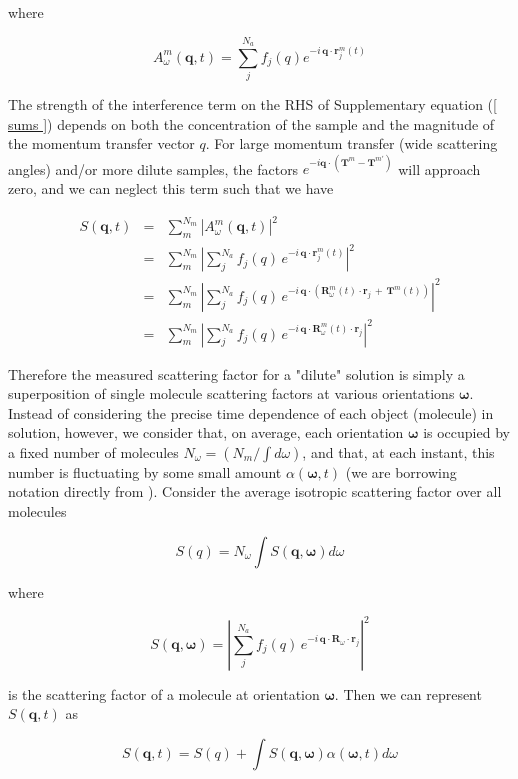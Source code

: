 \documentclass [12pt,fleqn]{article}
\def \be {\begin{equation}}
\def \ee {\end{equation}}
\def \beq {\begin{eqnarray}}
\def \eeq {\end{eqnarray}}
\begin{document}
where 

\be
A^m_\omega (\bm q,t ) = \sum_{j}^{N_a} f_j(q) e^{ -i \,\bm q \cdot \bm  r^m_j (t)  }
\ee

The strength of the interference term on the RHS of Supplementary equation (\ref{ sums }) depends on both the concentration of the sample and the magnitude of the momentum transfer vector $q$. For large momentum transfer (wide scattering angles) and/or more dilute samples, the factors $e^{-i \bm q \cdot (  \bm T^m - \bm T^{m'})}$ will approach zero, and we can neglect this term such that we have

\beq \label{ scatter}
S( \bm q, t) &=& \sum_m^{N_m} \left | A^m_\omega (\bm q,t ) \right|^2 \\
&=& \sum_m^{N_m} \left | \sum_{j}^{N_a} f_j(q)\, e^ { -i \,\bm q \cdot \bm  r^m _j (t)} \right | ^2   \\
&=& \sum_m^{N_m} \left | \sum_{j}^{N_a} f_j(q)\, e^ { -i \,\bm q \cdot \left (\bm {R}^m_\omega \left(t\right)\cdot \bm r_j \,+\, \bm {T}^m\left(t\right) \right)} \right | ^2 \\
&=& \sum_m^{N_m} \left | \sum_{j}^{N_a} f_j(q)\, e^ { -i \,\bm q \cdot \bm {R}^m_\omega (t)\cdot \bm r_j }  \right | ^2 
\eeq

Therefore the measured scattering factor for a "dilute" solution is simply a superposition of single molecule scattering factors at various orientations $\bm \omega$.  Instead of considering the precise time dependence of each object (molecule) in solution, however, we consider that, on average, each orientation $\bm \omega$ is occupied by a fixed number of molecules $N_\omega = (N_m/ \int d\omega)$, and that, at each instant, this number is fluctuating by some small amount $\alpha( \bm \omega, t )$ (we are borrowing notation directly from \cite{kam1977determination}). Consider the average isotropic scattering factor over all molecules

\be
S(q) = N _\omega \int S( \bm q, \bm \omega ) d\omega 
\ee

where

\be \label{scattering}
 S(\bm  q, \bm \omega )  = \left | \sum_{j}^{N_a} f_j(q)\, e^ { -i \,\bm q \cdot \bm {R}_\omega \cdot \bm r_j } \right | ^2 
\ee

is the scattering factor of a molecule at orientation $\bm \omega$. Then we can represent $S(\bm q, t)$ as 

\be
S(\bm q, t )  = S ( q )  + \int  S( \bm q, \bm \omega ) \alpha( \bm \omega ,t) d\omega 
\ee
\end{document}
